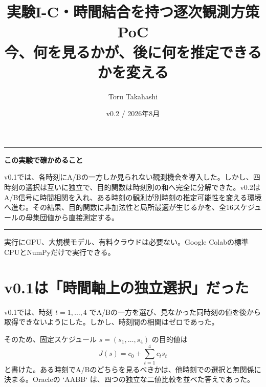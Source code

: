 \documentclass[11pt,a4paper]{ltjsarticle}
\title{\textbf{実験I-C・時間結合を持つ逐次観測方策PoC}\\
\large 今、何を見るかが、後に何を推定できるかを変える}
\author{Toru Takahashi}
\date{v0.2 / 2026年8月}
\newenvironment{takeaway}{\begin{center}\begin{minipage}{0.92\linewidth}\color{Main}\hrule\vspace{6pt}\color{black}}{\vspace{6pt}\color{Main}\hrule\color{black}\end{minipage}\end{center}}
\begin{document}
\maketitle

\begin{takeaway}
\textbf{この実験で確かめること}

v0.1では、各時刻にA/Bの一方しか見られない観測機会を導入した。しかし、四時刻の選択は互いに独立で、目的関数は時刻別の和へ完全に分解できた。v0.2はA/B信号に時間相関を入れ、ある時刻の観測が別時刻の推定可能性を変える環境へ進む。その結果、目的関数に非加法性と局所最適が生じるかを、全16スケジュールの母集団値から直接測定する。
\end{takeaway}

実行にGPU、大規模モデル、有料クラウドは必要ない。Google Colabの標準CPUとNumPyだけで実行できる。

\tableofcontents

\section{v0.1は「時間軸上の独立選択」だった}

v0.1では、時刻 $t=1,\dots,4$ でA/Bの一方を選び、見なかった同時刻の値を後から取得できないようにした。しかし、時刻間の相関はゼロであった。

そのため、固定スケジュール $s=(s_1,\dots,s_4)$ の目的値は
\begin{equation}
J(s)=c_0+\sum_{t=1}^{4}c_t s_t
\end{equation}
と書けた。ある時刻でA/Bのどちらを見るべきかは、他時刻での選択と無関係に決まる。Oracleの `AABB` は、四つの独立な二値比較を並べた答えであった。

\begin{center}
\end{center}
\end{document}
